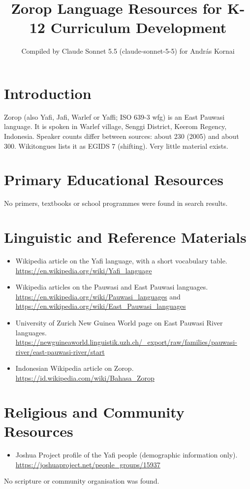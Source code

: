 \documentclass[12pt]{article}
\title{Zorop Language Resources for K-12 Curriculum Development}
\author{Compiled by Claude Sonnet 5.5 (claude-sonnet-5-5) for Andr\'as Kornai}
\date{}
\begin{document}
\maketitle

\section{Introduction}
Zorop (also Yafi, Jafi, Warlef or Yaffi; ISO 639-3 wfg) is an East Pauwasi language. It is spoken in Warlef village, Senggi District, Keerom Regency, Indonesia. Speaker counts differ between sources: about 230 (2005) and about 300. Wikitongues lists it as EGIDS 7 (shifting). Very little material exists.

\section{Primary Educational Resources}
No primers, textbooks or school programmes were found in search results.

\section{Linguistic and Reference Materials}
\begin{itemize}
\item Wikipedia article on the Yafi language, with a short vocabulary table. \url{https://en.wikipedia.org/wiki/Yafi_language}
\item Wikipedia articles on the Pauwasi and East Pauwasi languages. \url{https://en.wikipedia.org/wiki/Pauwasi_languages} and \url{https://en.wikipedia.org/wiki/East_Pauwasi_languages}
\item University of Zurich New Guinea World page on East Pauwasi River languages. \url{https://newguineaworld.linguistik.uzh.ch/_export/raw/families/pauwasi-river/east-pauwasi-river/start}
\item Indonesian Wikipedia article on Zorop. \url{https://id.wikipedia.com/wiki/Bahasa_Zorop}
\end{itemize}

\section{Religious and Community Resources}
\begin{itemize}
\item Joshua Project profile of the Yafi people (demographic information only). \url{https://joshuaproject.net/people_groups/15937}
\end{itemize}
No scripture or community organisation was found.
\end{document}
